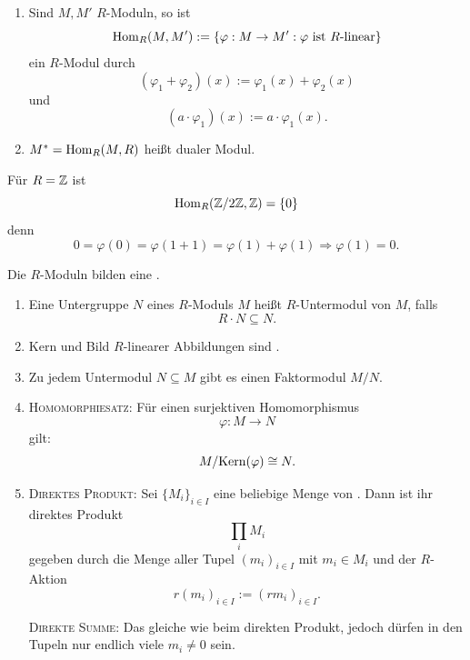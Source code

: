 \documentclass[a4paper, 10pt]{report}
\begin{document}
\begin{BemDef}
\begin{enumerate}
\item Sind $M,M'$ $R$-Moduln, so ist
\[
\Hom[R]{M}{M'} := \{\varphi: M \to M' : \varphi \text{ ist } R\text{-linear}\}
\]
ein $R$-Modul durch 
\[
(\varphi_1 + \varphi_2)(x) := \varphi_1(x) + \varphi_2(x) 
\]
und
\[
(a \cdot \varphi_1)(x) := a \cdot \varphi_1(x).
\]
\item $M^* = \Hom[R]{M}{R}$ heißt dualer Modul.
\end{enumerate}
\end{BemDef}

\newcommand{\BIGOP}[1]{\mathop{\mathchoice%
{\raise-0.22em\hbox{\huge $#1$}}%
{\raise-0.05em\hbox{\Large $#1$}}{\hbox{\large $#1$}}{#1}}}
\newcommand{\bigtimes}{\BIGOP{\times}} 

\begin{nnBsp}
Für $R = \mathbb{Z}$ ist 
\[
\Hom[R]{\ZZ/2\ZZ}{\ZZ} = \{ 0\}
\]
denn
\[
0 = \varphi(0) = \varphi(1 + 1) = \varphi(1)+\varphi(1) \Rightarrow \varphi(1) =
0.
\]
\end{nnBsp}

\begin{Bem}
Die $R$-Moduln bilden eine  .
\begin{enumerate}
\item Eine Untergruppe $N$ eines $R$-Moduls $M$ heißt $R$-Untermodul von
$M$, falls 
\[
R \cdot N \subseteq N.
\]
\item Kern und Bild $R$-linearer Abbildungen sind \RMods.
\item Zu jedem Untermodul $N \subseteq M$ gibt es einen Faktormodul $M/N$.
\item \textsc{Homomorphiesatz:} Für einen surjektiven Homomorphismus
\[
\varphi: M \to N 
\]
gilt:
\[
M/\mathrm{Kern}(\varphi) \cong N.
\]
\item \textsc{Direktes Produkt:} Sei ${\{M_{i}\}}_{i \in I}$ eine beliebige
Menge von \RMods.
Dann ist ihr direktes Produkt
\[
\prod_i M_i
\]
 gegeben durch die Menge aller Tupel ${(m_i)}_{i
\in I}$ mit $m_i \in M_i$ und der $R$-Aktion 
\[
{r(m_i)}_{i \in I} := {(rm_i)}_{i \in I}.
\]

\textsc{Direkte Summe:} Das gleiche wie beim direkten Produkt, jedoch dürfen in den 
Tupeln nur endlich viele $m_i \neq 0$ sein.
\end{enumerate}
\end{Bem}
\end{document}
